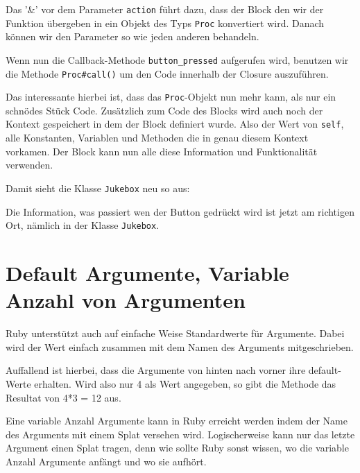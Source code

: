 \documentclass[a4book,11pt,twoside]{scrbook}
\begin{document}


Das '\&' vor dem Parameter \texttt{action} führt dazu, dass der Block den wir der Funktion übergeben in ein Objekt des Typs \texttt{Proc} konvertiert wird. Danach können wir den Parameter so wie jeden anderen behandeln.

Wenn nun die Callback-Methode \texttt{button\_pressed} aufgerufen wird, benutzen wir die Methode \texttt{Proc\#call()} um den Code innerhalb der Closure auszuführen.

Das interessante hierbei ist, dass das \texttt{Proc}-Objekt nun mehr kann, als nur ein schnödes Stück Code. Zusätzlich zum Code des Blocks wird auch noch der Kontext gespeichert in dem der Block definiert wurde. Also der Wert von \texttt{self}, alle Konstanten, Variablen und Methoden die in genau diesem Kontext vorkamen. Der Block kann nun alle diese Information und Funktionalität verwenden.

Damit sieht die Klasse \texttt{Jukebox} neu so aus:



Die Information, was passiert wen der Button gedrückt wird ist jetzt am richtigen Ort, nämlich in der Klasse \texttt{Jukebox}.





\section{Default Argumente, Variable Anzahl von Argumenten}
Ruby unterstützt auch auf einfache Weise Standardwerte für Argumente. Dabei wird der Wert einfach zusammen mit dem Namen des Arguments mitgeschrieben.



Auffallend ist hierbei, dass die Argumente von hinten nach vorner ihre default-Werte erhalten. Wird also nur 4 als Wert angegeben, so gibt die Methode das Resultat von 4*3 = 12 aus.


Eine variable Anzahl Argumente kann in Ruby erreicht werden indem der Name des Arguments mit einem Splat versehen wird. Logischerweise kann nur das letzte Argument einen Splat tragen, denn wie sollte Ruby sonst wissen, wo die variable Anzahl Argumente anfängt und wo sie aufhört.


\end{document}
